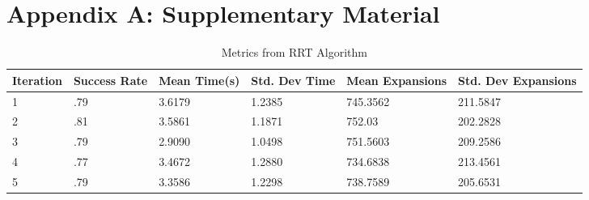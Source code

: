 \documentclass{article}
\begin{document}



\vspace{1cm}
\section{Appendix A: Supplementary Material}

\begin{table}[h]
  \caption{Metrics from RRT Algorithm}
  \label{RRT Metrics}
  \centering
  \begin{tabular}{llllll}
    \cmidrule(r){1-6}
   Iteration & Success Rate & Mean Time(s) & Std. Dev Time & Mean Expansions & Std. Dev Expansions\\
    \midrule
    1 & .79 & 3.6179 & 1.2385 & 745.3562 & 211.5847 \\
    2 & .81 & 3.5861 & 1.1871 & 752.03 & 202.2828 \\
    3 & .79 & 2.9090 & 1.0498 & 751.5603 & 209.2586 \\
    4 & .77 & 3.4672 & 1.2880 & 734.6838 & 213.4561 \\
    5 & .79 & 3.3586 & 1.2298 & 738.7589 & 205.6531 \\
    \bottomrule
  \end{tabular}
\end{table}











\end{document}
